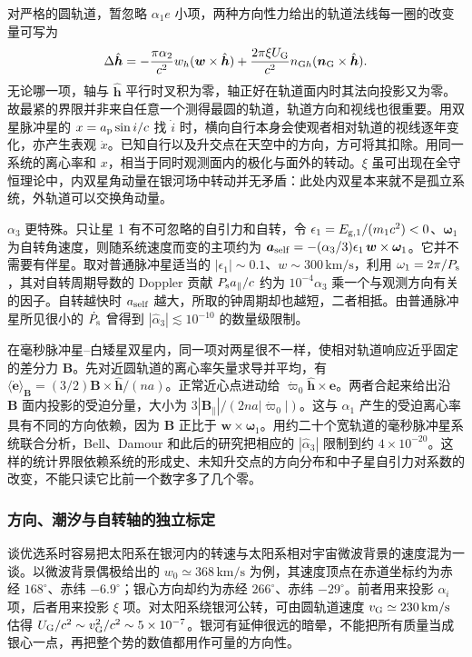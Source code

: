 对严格的圆轨道，暂忽略 $\alpha_1 e$ 小项，两种方向性力给出的轨道法线每一圈的改变量可写为
\[
 \Delta\hat{\bm h}
  =-\frac{\pi\alpha_2}{c^2}w_h(\bm w\times\hat{\bm h})
    +\frac{2\pi\xi U_{\rm G}}{c^2}n_{{\rm G}h}
                  (\bm n_{\rm G}\times\hat{\bm h}).
\]
无论哪一项，轴与 $\hat{\bm h}$ 平行时叉积为零，轴正好在轨道面内时其法向投影又为零。故最紧的界限并非来自任意一个测得最圆的轨道，轨道方向和视线也很重要。用双星脉冲星的 $x=a_{\rm p}\sin i/c$ 找 $\dot i$ 时，横向自行本身会使观者相对轨道的视线逐年变化，亦产生表观 $\dot x$。已知自行以及升交点在天空中的方向，方可将其扣除。用同一系统的离心率和 $x$，相当于同时观测面内的极化与面外的转动。$\xi$ 虽可出现在全守恒理论中，内双星角动量在银河场中转动并无矛盾：此处内双星本来就不是孤立系统，外轨道可以交换角动量。

$\alpha_3$ 更特殊。只让星 1 有不可忽略的自引力和自转，令 $\epsilon_1=E_{{\rm g},1}/(m_1c^2)<0$、$\bm\omega_1$ 为自转角速度，则随系统速度而变的主项约为 $\bm a_{\rm self}=-(\alpha_3/3)\epsilon_1\,\bm w\times\bm\omega_1$。它并不需要有伴星。取对普通脉冲星适当的 $|\epsilon_1|\sim0.1$、$w\sim300\,\mathrm{km/s}$，利用 $\omega_1=2\pi/P_{\rm s}$，其对自转周期导数的 Doppler 贡献 $P_{\rm s}a_\parallel/c$ 约为 $10^{-4}\alpha_3$ 乘一个与观测方向有关的因子。自转越快时 $a_{\rm self}$ 越大，所取的钟周期却也越短，二者相抵。由普通脉冲星所见很小的 $\dot P_{\rm s}$ 曾得到 $|\hat\alpha_3|\lesssim10^{-10}$ 的数量级限制。

在毫秒脉冲星--白矮星双星内，同一项对两星很不一样，使相对轨道响应近乎固定的差分力 $\bm B$。先对近圆轨道的离心率矢量求导并平均，有 $\langle\dot{\bm e}\rangle_{\bm B}=(3/2)\bm B\times\hat{\bm h}/(na)$。正常近心点进动给 $\dot\varpi_0\hat{\bm h}\times\bm e$。两者合起来给出沿 $\bm B$ 面内投影的受迫分量，大小为 $3|\bm B_\parallel|/(2na|\dot\varpi_0|)$。这与 $\alpha_1$ 产生的受迫离心率具有不同的方向依赖，因为 $\bm B$ 正比于 $\bm w\times\bm\omega_1$。用约二十个宽轨道的毫秒脉冲星系统联合分析，Bell、Damour 和此后的研究把相应的 $|\hat\alpha_3|$ 限制到约 $4\times10^{-20}$。这样的统计界限依赖系统的形成史、未知升交点的方向分布和中子星自引力对系数的改变，不能只读它比前一个数字多了几个零。

\subsubsection{方向、潮汐与自转轴的独立标定}

谈优选系时容易把太阳系在银河内的转速与太阳系相对宇宙微波背景的速度混为一谈。以微波背景偶极给出的 $w_0\simeq368\,\mathrm{km/s}$ 为例，其速度顶点在赤道坐标约为赤经 $168^\circ$、赤纬 $-6.9^\circ$；银心方向却约为赤经 $266^\circ$、赤纬 $-29^\circ$。前者用来投影 $\alpha_i$ 项，后者用来投影 $\xi$ 项。对太阳系绕银河公转，可由圆轨道速度 $v_{\rm G}\simeq230\,\mathrm{km/s}$ 估得 $U_{\rm G}/c^2\sim v_{\rm G}^2/c^2\sim5\times10^{-7}$。银河有延伸很远的暗晕，不能把所有质量当成银心一点，再把整个势的数值都用作可量的方向性。

